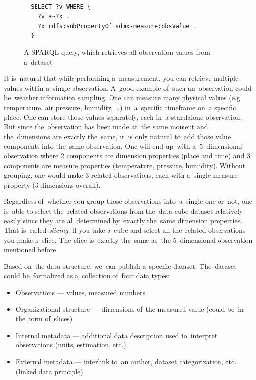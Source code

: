 \begin{figure}
\begin{verbatim}
  
  SELECT ?v WHERE {
    ?v a~?x .
    ?x rdfs:subPropertyOf sdmx-measure:obsValue .
  }

\end{verbatim}
\caption{A SPARQL query, which retrieves all observation values from a~dataset}
\label{fig:sparql-obsValue}
\end{figure}

It is~natural that while performing a~measurement, you can retrieve multiple
values within a~single observation. A~good example of~such an~observation could be~weather
information sampling. One can measure many physical values (e.g. temperature, air pressure,
humidity, …) in~a~specific timeframe on~a specific place. One can store those values separately,
each in~a standalone observation. But since the~observation has been made at~the same moment
and the~dimensions are exactly the~same, it~is only natural to~add those value components into
the~same observation. One will end up~with a~5--dimensional observation where 2 components 
are dimension properties (place and time) and 3 components are measure properties
(temperature, pressure, humidity). Without grouping, one would make 3 related observations,
each with a~single measure property (3 dimensions overall).

Regardless of~whether you group those observations into~a~single one or~not, one is~able
to select the~related observations from the~data cube dataset relatively easily since they
are all determined by~exactly the~same dimension properties. That is~called \emph{slicing}.
If you take a~cube and select all the~related observations you make a~slice. The~slice is~exactly
the~same as~the 5--dimensional observation mentioned before.

Based on~the data structure, we~can publish a~specific dataset. The~dataset could be~formalized
as a~collection of~four data types:

\begin{itemize}
\item Observations --- values, measured numbers.
\item Organizational structure --- dimensions of~the measured value (could be~in the~form of~slices)
\item Internal metadata --- additional data description used to~interpret observations (units, estimation,
etc.).
\item External metadata --- interlink to~an author, dataset categorization, etc. (linked data 
principle).
\end{itemize}

